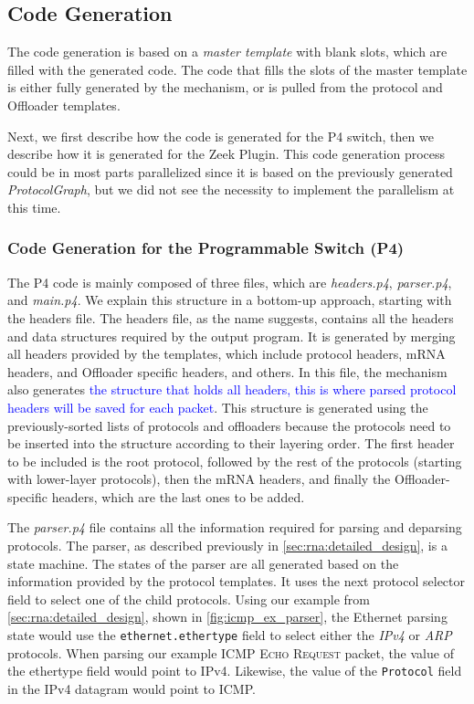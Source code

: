 \subsection{Code Generation}

The code generation is based on a \textit{master template} with blank slots, which are filled with the generated code. The code that fills the slots of the master template is either fully generated by the mechanism, or is pulled from the protocol and Offloader templates.

Next, we first describe how the code is generated for the P4 switch, then we describe how it is generated for the Zeek Plugin. This code generation process could be in most parts parallelized since it is based on the previously generated \textit{ProtocolGraph}, but we did not see the necessity to implement the parallelism at this time.

\subsubsection*{Code Generation for the Programmable Switch (P4)}

The P4 code is mainly composed of three files, which are \textit{headers.p4}, \textit{parser.p4}, and \textit{main.p4}. We explain this structure in a bottom-up approach, starting with the headers file. The headers file, as the name suggests, contains all the headers and data structures required by the output program. It is generated by merging all headers provided by the templates, which include protocol headers, mRNA headers, and Offloader specific headers\footnotemark{}, and others. In this file, the mechanism also generates \textcolor{blue}{the structure that holds all headers, this is where parsed protocol headers will be saved for each packet}. This structure is generated using the previously-sorted lists of protocols and offloaders because the protocols need to be inserted into the structure according to their layering order. The first header to be included is the root protocol, followed by the rest of the protocols (starting with lower-layer protocols), then the mRNA headers, and finally the Offloader-specific headers, which are the last ones to be added.


The \textit{parser.p4} file contains all the information required for parsing and deparsing protocols. The parser, as described previously in \autoref{sec:rna:detailed_design}, is a state machine. The states of the parser are all generated based on the information provided by the protocol templates. It uses the next protocol selector field to select one of the child protocols. Using our example from \autoref{sec:rna:detailed_design}, shown in \autoref{fig:icmp_ex_parser}, the Ethernet parsing state would use the \texttt{ethernet.ethertype} field to select either the \textit{IPv4} or \textit{ARP} protocols. When parsing our example \textsc{ICMP Echo Request} packet, the value of the ethertype field would point to IPv4. Likewise, the value of the \texttt{Protocol} field in the IPv4 datagram would point to ICMP.

